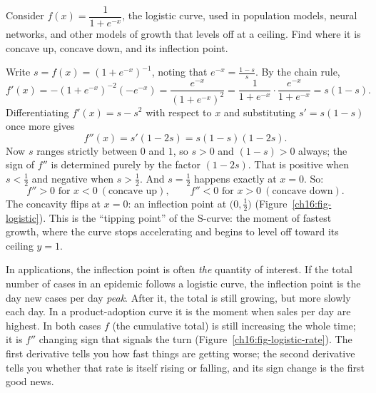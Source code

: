 \begin{example}\label{ch16:ex-logistic}
Consider $f(x)=\dfrac{1}{1+e^{-x}}$, the logistic curve, used in
population models, neural networks, and other models of growth that levels off
at a ceiling. Find
where it is concave up, concave down, and its inflection point.

\smallskip
Write $s=f(x)=(1+e^{-x})^{-1}$, noting that $e^{-x} = \frac{1-s}{s}$. By the chain rule,
\[
f'(x) = -(1+e^{-x})^{-2}(-e^{-x}) = \frac{e^{-x}}{(1+e^{-x})^2}
      = \frac{1}{1+e^{-x}}\cdot\frac{e^{-x}}{1+e^{-x}} = s(1-s).
\]
Differentiating $f'(x) = s - s^2$ with respect to $x$ and substituting $s' = s(1-s)$
once more gives
\[
f''(x) = s'(1-2s) = s(1-s)(1-2s).
\]
Now $s$ ranges strictly between $0$ and $1$, so $s>0$ and $(1-s)>0$ always; the
sign of $f''$ is determined purely by the factor $(1-2s)$. That is positive when
$s<\tfrac12$ and negative when $s>\tfrac12$. And $s=\tfrac12$ happens exactly at
$x=0$. So:
\[
f''>0 \text{ for } x<0 \ (\text{concave up}),\qquad
f''<0 \text{ for } x>0 \ (\text{concave down}).
\]
The concavity flips at $x=0$: an inflection point at $\big(0,\tfrac12\big)$
(Figure~\ref{ch16:fig-logistic}). This
is the ``tipping point'' of the S-curve: the moment of fastest growth,
where the curve stops accelerating and begins to level off toward its ceiling
$y=1$.
\end{example}

\begin{applicationbox}
In applications, the inflection point is often \emph{the} quantity of
interest. If the total number of cases in an epidemic follows a logistic curve,
the inflection point is the day new cases per day \emph{peak}. After it, the
total is still growing, but more slowly each day. In a product-adoption curve it
is the moment when sales per day are highest. In both cases
$f$ (the cumulative total) is still increasing the whole time; it is $f''$ changing
sign that signals the turn (Figure~\ref{ch16:fig-logistic-rate}). The first derivative tells you how fast things are
getting worse; the second derivative tells you whether that rate is itself rising
or falling, and its sign change is the first good news.
\end{applicationbox}

